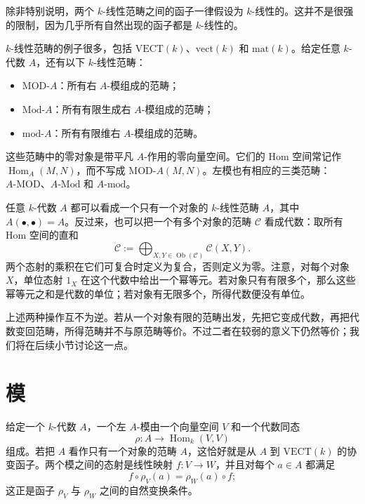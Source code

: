 除非特别说明，两个 $k$-线性范畴之间的函子一律假设为 $k$-线性的。这并不是很强的限制，因为几乎所有自然出现的函子都是 $k$-线性的。

\begin{example}[$k$-代数模范畴]\label{ex:module-categories}
$k$-线性范畴的例子很多，包括 $\mathrm{VECT}(k)$、$\mathrm{vect}(k)$ 和 $\mathrm{mat}(k)$。给定任意 $k$-代数 $A$，还有以下 $k$-线性范畴：
\begin{itemize}
  \item $\mathrm{MOD}\text{-}A$：所有右 $A$-模组成的范畴；
  \item $\mathrm{Mod}\text{-}A$：所有有限生成右 $A$-模组成的范畴；
  \item $\mathrm{mod}\text{-}A$：所有有限维右 $A$-模组成的范畴。
\end{itemize}
这些范畴中的零对象是带平凡 $A$-作用的零向量空间。它们的 Hom 空间常记作 $\operatorname{Hom}_A(M,N)$，而不写成 $\mathrm{MOD}\text{-}A(M,N)$。左模也有相应的三类范畴：$A\text{-}\mathrm{MOD}$、$A\text{-}\mathrm{Mod}$ 和 $A\text{-}\mathrm{mod}$。
\end{example}

\begin{example}[代数与范畴之间的转换]\label{ex:algebra-as-category}
任意 $k$-代数 $A$ 都可以看成一个只有一个对象的 $k$-线性范畴 $A$，其中 $A(\bullet,\bullet)=A$。反过来，也可以把一个有多个对象的范畴 $\mathcal C$ 看成代数：取所有 Hom 空间的直和
\[
  \mathcal C:=\bigoplus_{X,Y\in\operatorname{Ob}(\mathcal C)}\mathcal C(X,Y).
\]
两个态射的乘积在它们可复合时定义为复合，否则定义为零。注意，对每个对象 $X$，单位态射 $1_X$ 在这个代数中给出一个幂等元。若对象只有有限多个，那么这些幂等元之和是代数的单位；若对象有无限多个，所得代数便没有单位。
\begin{note}
上述两种操作互不为逆。若从一个对象有限的范畴出发，先把它变成代数，再把代数变回范畴，所得范畴并不与原范畴等价。不过二者在较弱的意义下仍然等价；我们将在后续小节讨论这一点。
\end{note}
\end{example}
\section{模}\label{sec:modules}
给定一个 $k$-代数 $A$，一个左 $A$-模由一个向量空间 $V$ 和一个代数同态
\[
  \rho\colon A\to\operatorname{Hom}_k(V,V)
\]
组成。若把 $A$ 看作只有一个对象的范畴 $A$，这恰好就是从 $A$ 到 $\mathrm{VECT}(k)$ 的协变函子。两个模之间的态射是线性映射 $f\colon V\to W$，并且对每个 $a\in A$ 都满足
\[
  f\circ\rho_V(a)=\rho_W(a)\circ f;
\]
这正是函子 $\rho_V$ 与 $\rho_W$ 之间的自然变换条件。

